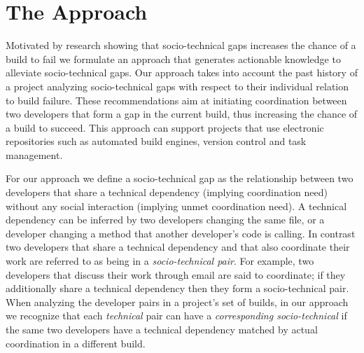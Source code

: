 \section{The Approach}
\label{chap:approach}
Motivated by research showing that socio-technical gaps increases the chance of a build to fail we formulate an approach that generates actionable knowledge to alleviate socio-technical gaps.
Our approach takes into account the past history of a project analyzing socio-technical gaps with respect to their individual relation to build failure.
These recommendations aim at initiating coordination between two developers that form a gap in the current build, thus increasing the chance of a build to succeed.
This approach can support projects that use electronic repositories such as automated build engines, version control and task management.

For our approach we define a socio-technical gap as the relationship between two developers that share a technical dependency (implying coordination need) without any social interaction (implying unmet coordination need).
A technical dependency can be inferred by two developers changing the same file, or a developer changing a method that another developer's code is calling.
In contrast two developers that share a technical dependency and that also coordinate their work are referred to as being in a \emph{socio-technical pair}.
For example, two developers that discuss their work through email are said to coordinate; if they additionally share a technical dependency then they form a socio-technical pair.
%
When analyzing the developer pairs in a project's set of builds, in our approach we recognize that each \emph{technical} pair can have a \emph{corresponding socio-technical} if the same two developers have a technical dependency matched by actual coordination in a different build. 



